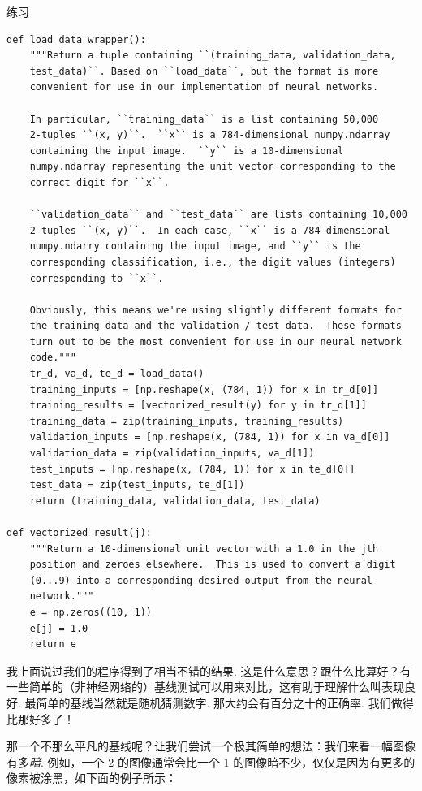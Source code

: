 \begin{exerciseBox}{练习}
\begin{lstlisting}
def load_data_wrapper():
    """Return a tuple containing ``(training_data, validation_data,
    test_data)``. Based on ``load_data``, but the format is more
    convenient for use in our implementation of neural networks.

    In particular, ``training_data`` is a list containing 50,000
    2-tuples ``(x, y)``.  ``x`` is a 784-dimensional numpy.ndarray
    containing the input image.  ``y`` is a 10-dimensional
    numpy.ndarray representing the unit vector corresponding to the
    correct digit for ``x``.

    ``validation_data`` and ``test_data`` are lists containing 10,000
    2-tuples ``(x, y)``.  In each case, ``x`` is a 784-dimensional
    numpy.ndarry containing the input image, and ``y`` is the
    corresponding classification, i.e., the digit values (integers)
    corresponding to ``x``.

    Obviously, this means we're using slightly different formats for
    the training data and the validation / test data.  These formats
    turn out to be the most convenient for use in our neural network
    code."""
    tr_d, va_d, te_d = load_data()
    training_inputs = [np.reshape(x, (784, 1)) for x in tr_d[0]]
    training_results = [vectorized_result(y) for y in tr_d[1]]
    training_data = zip(training_inputs, training_results)
    validation_inputs = [np.reshape(x, (784, 1)) for x in va_d[0]]
    validation_data = zip(validation_inputs, va_d[1])
    test_inputs = [np.reshape(x, (784, 1)) for x in te_d[0]]
    test_data = zip(test_inputs, te_d[1])
    return (training_data, validation_data, test_data)

def vectorized_result(j):
    """Return a 10-dimensional unit vector with a 1.0 in the jth
    position and zeroes elsewhere.  This is used to convert a digit
    (0...9) into a corresponding desired output from the neural
    network."""
    e = np.zeros((10, 1))
    e[j] = 1.0
    return e

\end{lstlisting}

我上面说过我们的程序得到了相当不错的结果. 这是什么意思？跟什么比算好？有一些简单的（非神经网络的）基线测试可以用来对比，这有助于理解什么叫表现良好. 最简单的基线当然就是随机猜测数字. 那大约会有百分之十的正确率. 我们做得比那好多了！

那一个不那么平凡的基线呢？让我们尝试一个极其简单的想法：我们来看一幅图像有多\emph{暗}. 例如，一个 $2$ 的图像通常会比一个 $1$ 的图像暗不少，仅仅是因为有更多的像素被涂黑，如下面的例子所示：


\end{exerciseBox}
